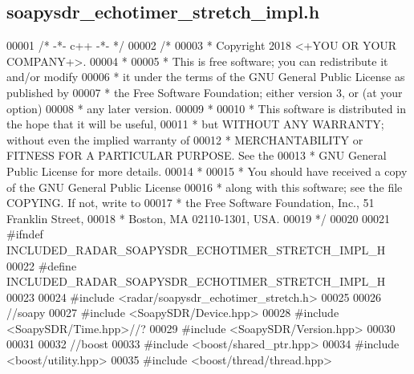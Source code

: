\subsection{soapysdr\+\_\+echotimer\+\_\+stretch\+\_\+impl.\+h}
\label{soapysdr__echotimer__stretch__impl_8h_source}

\begin{DoxyCode}
00001 \textcolor{comment}{/* -*- c++ -*- */}
00002 \textcolor{comment}{/*}
00003 \textcolor{comment}{ * Copyright 2018 <+YOU OR YOUR COMPANY+>.}
00004 \textcolor{comment}{ *}
00005 \textcolor{comment}{ * This is free software; you can redistribute it and/or modify}
00006 \textcolor{comment}{ * it under the terms of the GNU General Public License as published by}
00007 \textcolor{comment}{ * the Free Software Foundation; either version 3, or (at your option)}
00008 \textcolor{comment}{ * any later version.}
00009 \textcolor{comment}{ *}
00010 \textcolor{comment}{ * This software is distributed in the hope that it will be useful,}
00011 \textcolor{comment}{ * but WITHOUT ANY WARRANTY; without even the implied warranty of}
00012 \textcolor{comment}{ * MERCHANTABILITY or FITNESS FOR A PARTICULAR PURPOSE.  See the}
00013 \textcolor{comment}{ * GNU General Public License for more details.}
00014 \textcolor{comment}{ *}
00015 \textcolor{comment}{ * You should have received a copy of the GNU General Public License}
00016 \textcolor{comment}{ * along with this software; see the file COPYING.  If not, write to}
00017 \textcolor{comment}{ * the Free Software Foundation, Inc., 51 Franklin Street,}
00018 \textcolor{comment}{ * Boston, MA 02110-1301, USA.}
00019 \textcolor{comment}{ */}
00020 
00021 \textcolor{preprocessor}{#ifndef INCLUDED\_RADAR\_SOAPYSDR\_ECHOTIMER\_STRETCH\_IMPL\_H}
00022 \textcolor{preprocessor}{#define INCLUDED\_RADAR\_SOAPYSDR\_ECHOTIMER\_STRETCH\_IMPL\_H}
00023 
00024 \textcolor{preprocessor}{#include <radar/soapysdr_echotimer_stretch.h>}
00025 
00026 \textcolor{comment}{//soapy}
00027 \textcolor{preprocessor}{#include <SoapySDR/Device.hpp>}
00028 \textcolor{preprocessor}{#include <SoapySDR/Time.hpp>}\textcolor{comment}{//?}
00029 \textcolor{preprocessor}{#include <SoapySDR/Version.hpp>}
00030 
00031 
00032 \textcolor{comment}{//boost}
00033 \textcolor{preprocessor}{#include <boost/shared\_ptr.hpp>}
00034 \textcolor{preprocessor}{#include <boost/utility.hpp>}
00035 \textcolor{preprocessor}{#include <boost/thread/thread.hpp>}

\end{DoxyCode}
